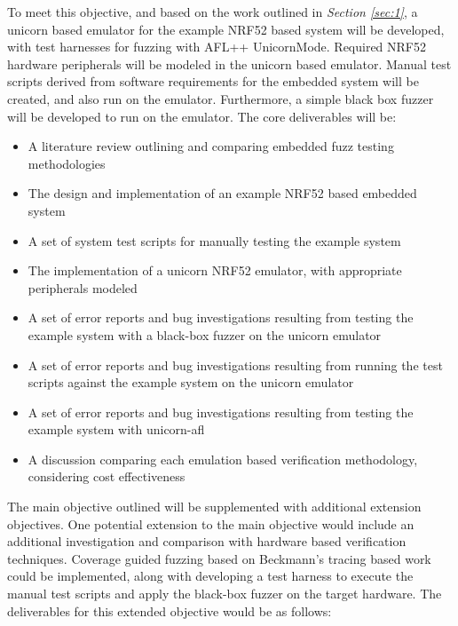 \documentclass[11pt]{article}
\begin{document}

To meet this objective, and based on the work outlined in \textit{Section
\ref{sec:1}}, a unicorn based emulator for the example NRF52 based system will
be developed, with test harnesses for fuzzing with AFL++ UnicornMode. Required
NRF52 hardware peripherals will be modeled in the unicorn based emulator.
Manual test scripts derived from software requirements for the embedded system
will be created, and also run on the emulator. Furthermore, a simple black box
fuzzer will be developed to run on the emulator. The core deliverables will be:

\begin{itemize}
\item A literature review outlining and comparing embedded fuzz testing methodologies
\item The design and implementation of an example NRF52 based embedded system
\item A set of system test scripts for manually testing the example system
\item The implementation of a unicorn NRF52 emulator, with appropriate peripherals modeled
\item A set of error reports and bug investigations resulting from testing the example system with a black-box fuzzer on the unicorn emulator
\item A set of error reports and bug investigations resulting from running the test scripts against the example system on the unicorn emulator
\item A set of error reports and bug investigations resulting from testing the example system with unicorn-afl
\item A discussion comparing each emulation based verification methodology, considering cost effectiveness
\end{itemize}

The main objective outlined will be supplemented with additional extension
objectives. One potential extension to the main objective would include an
additional investigation and comparison with hardware based verification
techniques. Coverage guided fuzzing based on Beckmann's tracing based work
\citep{Beckmann_2023} could be implemented, along with developing a test
harness to execute the manual test scripts and apply the black-box fuzzer on
the target hardware. The deliverables for this extended objective would be as follows:
\end{document}
